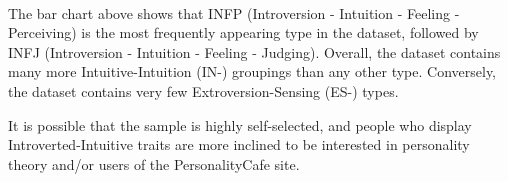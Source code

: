 \documentclass[11pt]{article}
\begin{document}
    \begin{center}
    \end{center}
    { \hspace*{\fill} \\}
    
    The bar chart above shows that INFP (Introversion - Intuition - Feeling
- Perceiving) is the most frequently appearing type in the dataset,
followed by INFJ (Introversion - Intuition - Feeling - Judging).
Overall, the dataset contains many more Intuitive-Intuition (IN-)
groupings than any other type. Conversely, the dataset contains very few
Extroversion-Sensing (ES-) types.

It is possible that the sample is highly self-selected, and people who
display Introverted-Intuitive traits are more inclined to be interested
in personality theory and/or users of the PersonalityCafe site.
\end{document}
